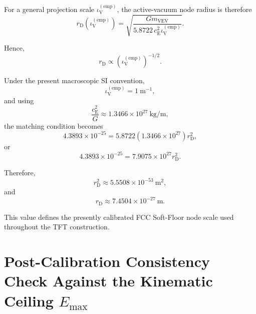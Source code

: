 For a general projection scale
$\iota_{\mathrm V}^{(\mathrm{emp})}$,
the active-vacuum node radius is therefore
\begin{equation}
    \boxed{
    r_{\mathrm D}
    \left(
        \iota_{\mathrm V}^{(\mathrm{emp})}
    \right)
    =
    \sqrt{
        \frac{
            Gm_{\mathrm{VEV}}
        }{
            5.8722\,
            c_{\mathrm E}^{2}
            \iota_{\mathrm V}^{(\mathrm{emp})}
        }
    }.
    }
\end{equation}

Hence,
\begin{equation}
    r_{\mathrm D}
    \propto
    \left(
        \iota_{\mathrm V}^{(\mathrm{emp})}
    \right)^{-1/2}.
\end{equation}

Under the present macroscopic SI convention,
\begin{equation}
    \iota_{\mathrm V}^{(\mathrm{emp})}
    =
    1~\mathrm{m^{-1}},
\end{equation}
and using
\begin{equation}
    \frac{
        c_{\mathrm E}^{2}
    }{
        G
    }
    \approx
    1.3466\times10^{27}~\mathrm{kg/m},
\end{equation}
the matching condition becomes
\begin{equation}
    4.3893\times10^{-25}
    =
    5.8722
    \left(
        1.3466\times10^{27}
    \right)
    r_{\mathrm D}^{2},
\end{equation}
or
\begin{equation}
    4.3893\times10^{-25}
    =
    7.9075\times10^{27}
    r_{\mathrm D}^{2}.
\end{equation}

Therefore,
\begin{equation}
    r_{\mathrm D}^{2}
    \approx
    5.5508\times10^{-53}~\mathrm{m^{2}},
\end{equation}
and
\begin{equation}
    \boxed{
    r_{\mathrm D}
    \approx
    7.4504\times10^{-27}~\mathrm m.
    }
\end{equation}

This value defines the presently calibrated FCC Soft-Floor node scale used
throughout the TFT construction.


\section{Post-Calibration Consistency Check Against the Kinematic Ceiling
\texorpdfstring{$E_{\mathrm{max}}$}{Emax}}

